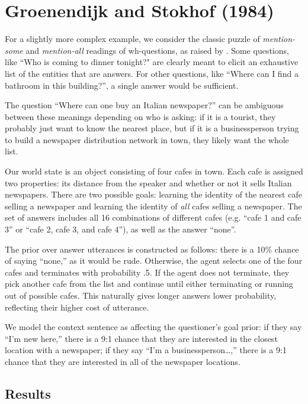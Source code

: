 \documentclass[10pt,letterpaper]{article}
\begin{document}
\section{Groenendijk and Stokhof (1984)}

For a slightly more complex example, we consider the classic puzzle of \emph{mention-some} and \emph{mention-all} readings of wh-questions, as raised by . Some questions, like ``Who is coming to dinner tonight?" are clearly meant to elicit an exhaustive list of the entities that are answers. For other questions, like ``Where can I find a bathroom in this building?'', a single answer would be sufficient. 

The question ``Where can one buy an Italian newspaper?'' can be ambiguous between these meanings depending on who is asking: if it is a tourist, they probably just want to know the nearest place, but if it is a businessperson trying to build a newspaper distribution network in town, they likely want the whole list. 

Our world state is an object consisting of four cafes in town. Each cafe is assigned two properties: its distance from the speaker and whether or not it sells Italian newspapers. There are two possible goals: learning the identity of the nearest cafe selling a newspaper and learning the identity of \emph{all} cafes selling a newspaper. The set of answers includes all 16 combinations of different cafes (e.g. ``cafe 1 and cafe 3'' or ``cafe 2, cafe 3, and cafe 4''), as well as the answer ``none''. 

The prior over answer utterances is constructed as follows: there is a 10\% chance of saying ``none,'' as it would be rude. Otherwise, the agent selects one of the four cafes and terminates with probability .5. If the agent does not terminate, they pick another cafe from the list and continue until either terminating or running out of possible cafes. This naturally gives longer answers lower probability, reflecting their higher cost of utterance.

We model the context sentence as affecting the questioner's goal prior: if they say ``I'm new here,'' there is a 9:1 chance that they are interested in the closest location with a newspaper; if they say ``I'm a businessperson\dots,'' there is a 9:1 chance that they are interested in all of the newspaper locations. 

\subsection{Results}
\end{document}
